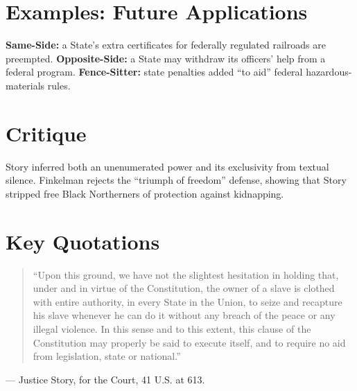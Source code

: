 \documentclass[12pt]{article}
\begin{document}
\section{Examples: Future Applications}
\textbf{Same-Side:} a State's extra certificates for federally regulated railroads are preempted. \textbf{Opposite-Side:} a State may withdraw its officers' help from a federal program. \textbf{Fence-Sitter:} state penalties added ``to aid'' federal hazardous-materials rules.

\section{Critique}
Story inferred both an unenumerated power and its exclusivity from textual silence. Finkelman rejects the ``triumph of freedom'' defense, showing that Story stripped free Black Northerners of protection against kidnapping.

\section{Key Quotations}
\begin{quote}
``Upon this ground, we have not the slightest hesitation in holding that, under and in virtue of the Constitution, the owner of a slave is clothed with entire authority, in every State in the Union, to seize and recapture his slave whenever he can do it without any breach of the peace or any illegal violence. In this sense and to this extent, this clause of the Constitution may properly be said to execute itself, and to require no aid from legislation, state or national.''
\end{quote}
\noindent --- Justice Story, for the Court, 41 U.S. at 613.
\end{document}
